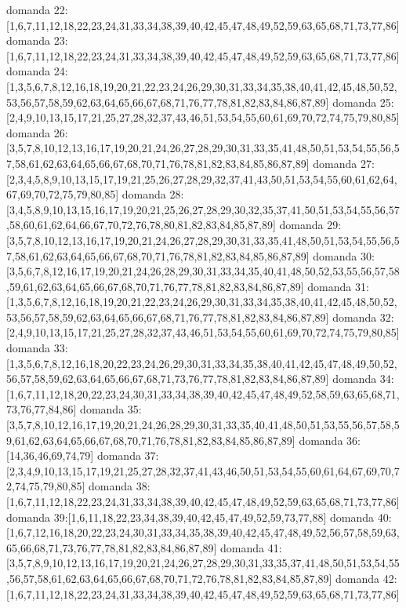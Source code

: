 domanda 22:[1,6,7,11,12,18,22,23,24,31,33,34,38,39,40,42,45,47,48,49,52,59,63,65,68,71,73,77,86]
domanda 23:[1,6,7,11,12,18,22,23,24,31,33,34,38,39,40,42,45,47,48,49,52,59,63,65,68,71,73,77,86]
domanda 24:[1,3,5,6,7,8,12,16,18,19,20,21,22,23,24,26,29,30,31,33,34,35,38,40,41,42,45,48,50,52,53,56,57,58,59,62,63,64,65,66,67,68,71,76,77,78,81,82,83,84,86,87,89]
domanda 25:[2,4,9,10,13,15,17,21,25,27,28,32,37,43,46,51,53,54,55,60,61,69,70,72,74,75,79,80,85]
domanda 26:[3,5,7,8,10,12,13,16,17,19,20,21,24,26,27,28,29,30,31,33,35,41,48,50,51,53,54,55,56,57,58,61,62,63,64,65,66,67,68,70,71,76,78,81,82,83,84,85,86,87,89]
domanda 27:[2,3,4,5,8,9,10,13,15,17,19,21,25,26,27,28,29,32,37,41,43,50,51,53,54,55,60,61,62,64,67,69,70,72,75,79,80,85]
domanda 28:[3,4,5,8,9,10,13,15,16,17,19,20,21,25,26,27,28,29,30,32,35,37,41,50,51,53,54,55,56,57,58,60,61,62,64,66,67,70,72,76,78,80,81,82,83,84,85,87,89]
domanda 29:[3,5,7,8,10,12,13,16,17,19,20,21,24,26,27,28,29,30,31,33,35,41,48,50,51,53,54,55,56,57,58,61,62,63,64,65,66,67,68,70,71,76,78,81,82,83,84,85,86,87,89]
domanda 30:[3,5,6,7,8,12,16,17,19,20,21,24,26,28,29,30,31,33,34,35,40,41,48,50,52,53,55,56,57,58,59,61,62,63,64,65,66,67,68,70,71,76,77,78,81,82,83,84,86,87,89]
domanda 31:[1,3,5,6,7,8,12,16,18,19,20,21,22,23,24,26,29,30,31,33,34,35,38,40,41,42,45,48,50,52,53,56,57,58,59,62,63,64,65,66,67,68,71,76,77,78,81,82,83,84,86,87,89]
domanda 32:[2,4,9,10,13,15,17,21,25,27,28,32,37,43,46,51,53,54,55,60,61,69,70,72,74,75,79,80,85]
domanda 33:[1,3,5,6,7,8,12,16,18,20,22,23,24,26,29,30,31,33,34,35,38,40,41,42,45,47,48,49,50,52,56,57,58,59,62,63,64,65,66,67,68,71,73,76,77,78,81,82,83,84,86,87,89]
domanda 34:[1,6,7,11,12,18,20,22,23,24,30,31,33,34,38,39,40,42,45,47,48,49,52,58,59,63,65,68,71,73,76,77,84,86]
domanda 35:[3,5,7,8,10,12,16,17,19,20,21,24,26,28,29,30,31,33,35,40,41,48,50,51,53,55,56,57,58,59,61,62,63,64,65,66,67,68,70,71,76,78,81,82,83,84,85,86,87,89]
domanda 36:[14,36,46,69,74,79]
domanda 37:[2,3,4,9,10,13,15,17,19,21,25,27,28,32,37,41,43,46,50,51,53,54,55,60,61,64,67,69,70,72,74,75,79,80,85]
domanda 38:[1,6,7,11,12,18,22,23,24,31,33,34,38,39,40,42,45,47,48,49,52,59,63,65,68,71,73,77,86]
domanda 39:[1,6,11,18,22,23,34,38,39,40,42,45,47,49,52,59,73,77,88]
domanda 40:[1,6,7,12,16,18,20,22,23,24,30,31,33,34,35,38,39,40,42,45,47,48,49,52,56,57,58,59,63,65,66,68,71,73,76,77,78,81,82,83,84,86,87,89]
domanda 41:[3,5,7,8,9,10,12,13,16,17,19,20,21,24,26,27,28,29,30,31,33,35,37,41,48,50,51,53,54,55,56,57,58,61,62,63,64,65,66,67,68,70,71,72,76,78,81,82,83,84,85,87,89]
domanda 42:[1,6,7,11,12,18,22,23,24,31,33,34,38,39,40,42,45,47,48,49,52,59,63,65,68,71,73,77,86]
